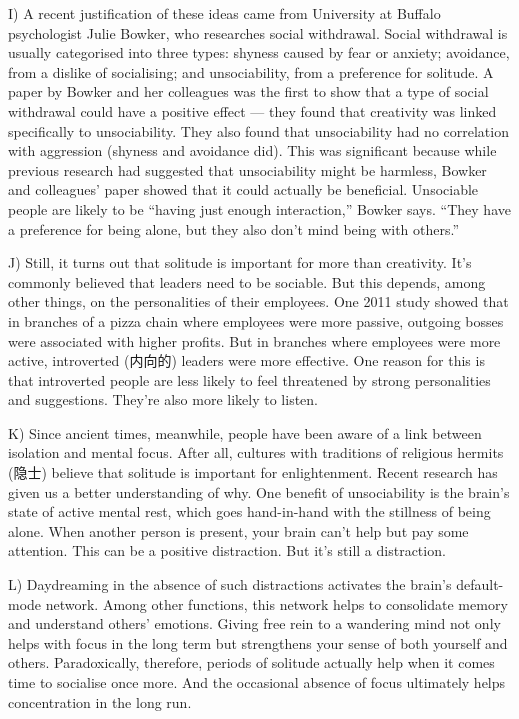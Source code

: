 \documentclass[UTF8,11pt]{ctexart}
\begin{document}
I) A recent justification of these ideas came from University at Buffalo psychologist Julie Bowker, who researches social withdrawal. Social withdrawal is usually categorised into three types: shyness caused by fear or anxiety; avoidance, from a dislike of socialising; and unsociability, from a preference for solitude. A paper by Bowker and her colleagues was the first to show that a type of social withdrawal could have a positive effect — they found that creativity was linked specifically to unsociability. They also found that unsociability had no correlation with aggression (shyness and avoidance did). This was significant because while previous research had suggested that unsociability might be harmless, Bowker and colleagues’ paper showed that it could actually be beneficial. Unsociable people are likely to be “having just enough interaction,” Bowker says. “They have a preference for being alone, but they also don’t mind being with others.”


J) Still, it turns out that solitude is important for more than creativity. It’s commonly believed that leaders need to be sociable. But this depends, among other things, on the personalities of their employees. One 2011 study showed that in branches of a pizza chain where employees were more passive, outgoing bosses were associated with higher profits. But in branches where employees were more active, introverted (内向的) leaders were more effective. One reason for this is that introverted people are less likely to feel threatened by strong personalities and suggestions. They’re also more likely to listen.


K) Since ancient times, meanwhile, people have been aware of a link between isolation and mental focus. After all, cultures with traditions of religious hermits (隐士) believe that solitude is important for enlightenment. Recent research has given us a better understanding of why. One benefit of unsociability is the brain’s state of active mental rest, which goes hand-in-hand with the stillness of being alone. When another person is present, your brain can’t help but pay some attention. This can be a positive distraction. But it’s still a distraction.


L) Daydreaming in the absence of such distractions activates the brain’s default-mode network. Among other functions, this network helps to consolidate memory and understand others’ emotions. Giving free rein to a wandering mind not only helps with focus in the long term but strengthens your sense of both yourself and others. Paradoxically, therefore, periods of solitude actually help when it comes time to socialise once more. And the occasional absence of focus ultimately helps concentration in the long run.
\end{document}
